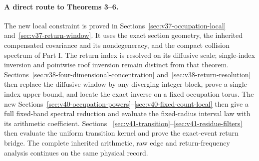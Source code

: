 \documentclass[11pt,reqno]{amsart}
\numberwithin{equation}{section}
\theoremstyle{definition}\newtheorem{definition}[theorem]{Definition}
\theoremstyle{remark}\newtheorem{remark}[theorem]{Remark}
\begin{document}
\paragraph{A direct route to Theorems 3--6.}
The new local constraint is proved in
Sections~\ref{sec:v37-occupation-local} and~\ref{sec:v37-return-window}.
It uses the exact section geometry, the inherited compensated
covariance and its nondegeneracy, and the compact collision spectrum
of Part I. The return index is resolved on its diffusive scale;
single-index inversion and pointwise roof inversion remain distinct
from that theorem. Sections~\ref{sec:v38-four-dimensional-concentration}
and~\ref{sec:v38-return-resolution} then replace the diffusive window
by any diverging integer block, prove a single-index upper bound, and
locate the exact inverse on a fixed occupation torus. The new
Sections~\ref{sec:v40-occupation-powers}--\ref{sec:v40-fixed-count-local}
then give a full fixed-band spectral reduction and evaluate the
fixed-radius interval law with its arithmetic coefficient. Sections~
\ref{sec:v41-transition}--\ref{sec:v41-residue-filters} then evaluate
the uniform transition kernel and prove the exact-event return bridge. The
complete inherited arithmetic, raw edge and return-frequency analysis
continues on the same physical record.

















\end{document}
